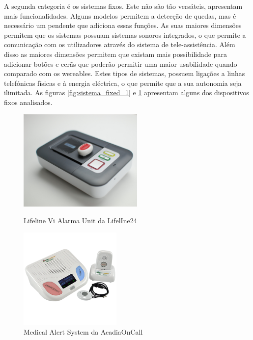 A segunda categoria é os sistemas fixos. Este não são tão versáteis, apresentam mais funcionalidades. Alguns modelos permitem a detecção de quedas, mas é necessário um pendente que adiciona essas funções. As suas maiores dimensões permitem que os sistemas possuam sistemas sonoros integrados, o que permite a comunicação com os utilizadores através do sistema de tele-assistência. Além disso as maiores dimensões permitem que existam mais possibilidade para adicionar botões e ecrãs que poderão permitir uma maior usabilidade quando comparado com os wereables. Estes tipos de sistemas, possuem ligações a linhas telefónicas físicas e à energia eléctrica, o que permite que a sua autonomia seja ilimitada.
As figuras \ref{fig:sistema_fixed_1} e \ref{fig:sistema_fixed_2} apresentam alguns dos dispositivos fixos analisados.
\vspace*{-11cm}
\begin{figure}[!htb]
	\centering
	\begin{minipage}[b]{0.45\textwidth}\centering
		\includegraphics[height=5cm]{figuras/Sistemas_Lifeline.png}
		\caption{Lifeline Vi Alarma Unit da LifelIne24}
		\label{fig:sistema_fixed_1}
	\end{minipage}
	\hfill
	\begin{minipage}[b]{0.45\textwidth}\centering
		\includegraphics[height=5cm]{figuras/sistemas_Medical_Alert_System.png}
		\caption{Medical Alert System da AcadiaOnCall}
		\label{fig:sistema_fixed_2}
	\end{minipage}
\end{figure}

\pagebreak